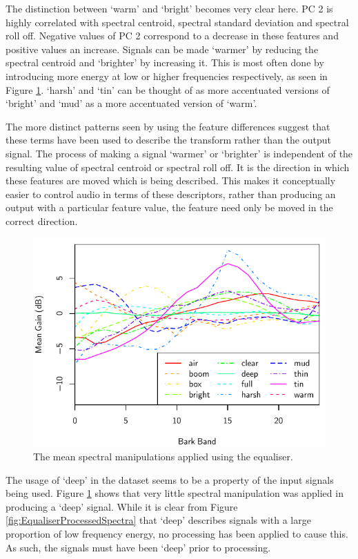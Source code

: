 			The distinction between `warm' and `bright' becomes very clear here. PC 2 is highly correlated with
			spectral centroid, spectral standard deviation and spectral roll off. Negative values of PC 2
			correspond to a decrease in these features and positive values an increase. Signals can be made
			`warmer' by reducing the spectral centroid and `brighter' by increasing it. This is most often done
			by introducing more energy at low or higher frequencies respectively, as seen in Figure
			\ref{fig:EqualiserDifferenceSpectra}. `harsh' and `tin' can be thought of as more accentuated
			versions of `bright' and `mud' as a more accentuated version of `warm'.

			The more distinct patterns seen by using the feature differences suggest that these terms have been
			used to describe the transform rather than the output signal. The process of making a signal
			`warmer' or `brighter' is independent of the resulting value of spectral centroid or spectral roll
			off. It is the direction in which these features are moved which is being described. This makes it
			conceptually easier to control audio in terms of these descriptors, rather than producing an output
			with a particular feature value, the feature need only be moved in the correct direction.

			\begin{figure}[h!]
				\centering
				\includegraphics{chapter4/Images/EqualiserDifferenceSpectra.pdf}
				\caption{The mean spectral manipulations applied using the equaliser.}
				\label{fig:EqualiserDifferenceSpectra}
			\end{figure}

			The usage of `deep' in the dataset seems to be a property of the input signals being used. Figure
			\ref{fig:EqualiserDifferenceSpectra} shows that very little spectral manipulation was applied in
			producing a `deep' signal. While it is clear from Figure \ref{fig:EqualiserProcessedSpectra} that
			`deep' describes signals with a large proportion of low frequency energy, no processing has been
			applied to cause this. As such, the signals must have been `deep' prior to processing.

